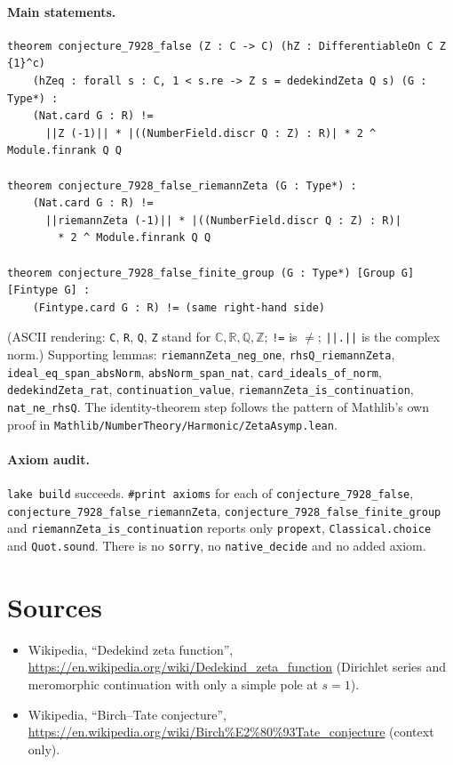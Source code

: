 \documentclass[11pt]{article}
\theoremstyle{remark}
\newcommand{\Q}{\mathbb{Q}}
\newcommand{\Z}{\mathbb{Z}}
\newcommand{\C}{\mathbb{C}}
\begin{document}
\paragraph{Main statements.}
{\small
\begin{verbatim}
theorem conjecture_7928_false (Z : C -> C) (hZ : DifferentiableOn C Z {1}^c)
    (hZeq : forall s : C, 1 < s.re -> Z s = dedekindZeta Q s) (G : Type*) :
    (Nat.card G : R) !=
      ||Z (-1)|| * |((NumberField.discr Q : Z) : R)| * 2 ^ Module.finrank Q Q

theorem conjecture_7928_false_riemannZeta (G : Type*) :
    (Nat.card G : R) !=
      ||riemannZeta (-1)|| * |((NumberField.discr Q : Z) : R)|
        * 2 ^ Module.finrank Q Q

theorem conjecture_7928_false_finite_group (G : Type*) [Group G] [Fintype G] :
    (Fintype.card G : R) != (same right-hand side)
\end{verbatim}
}
(ASCII rendering: \texttt{C}, \texttt{R}, \texttt{Q}, \texttt{Z} stand for $\C,\mathbb R,\Q,\Z$;
\texttt{!=} is $\ne$; \texttt{||.||} is the complex norm.) Supporting lemmas:
\texttt{riemannZeta\_neg\_one}, \texttt{rhsQ\_riemannZeta}, \texttt{ideal\_eq\_span\_absNorm},
\texttt{absNorm\_span\_nat}, \texttt{card\_ideals\_of\_norm}, \texttt{dedekindZeta\_rat},
\texttt{continuation\_value}, \texttt{riemannZeta\_is\_continuation}, \texttt{nat\_ne\_rhsQ}. The
identity-theorem step follows the pattern of Mathlib's own proof in
\texttt{Mathlib/NumberTheory/Harmonic/ZetaAsymp.lean}.

\paragraph{Axiom audit.} \texttt{lake build} succeeds. \texttt{\#print axioms} for each of
\texttt{conjecture\_7928\_false}, \texttt{conjecture\_7928\_false\_riemannZeta},
\texttt{conjecture\_7928\_false\_finite\_group} and \texttt{riemannZeta\_is\_continuation} reports
only \texttt{propext}, \texttt{Classical.choice} and \texttt{Quot.sound}. There is no \texttt{sorry},
no \texttt{native\_decide} and no added axiom.

\section*{Sources}
\begin{itemize}
\item Wikipedia, ``Dedekind zeta function'',
  \url{https://en.wikipedia.org/wiki/Dedekind_zeta_function} (Dirichlet series and meromorphic
  continuation with only a simple pole at $s=1$).
\item Wikipedia, ``Birch--Tate conjecture'',
  \url{https://en.wikipedia.org/wiki/Birch%E2%80%93Tate_conjecture} (context only).
\end{itemize}
\end{document}
